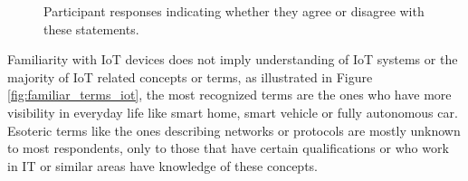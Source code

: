 \begin{figure}[H]
    \begin{center}
        \caption{Participant responses indicating whether they agree or disagree with these statements.}
        \label{fig:internet_of_things_device_usage}
    \end{center}
\end{figure}



Familiarity with IoT devices does not imply understanding of IoT systems
or the majority of IoT related concepts or terms,
as illustrated in Figure \ref{fig:familiar_terms_iot},
the most recognized terms are the ones who have more visibility
in everyday life like smart home, smart vehicle or fully autonomous car.
Esoteric terms like the ones describing networks or protocols are mostly
unknown to most respondents, only to those that have certain
qualifications or who work in IT or similar areas have knowledge of these concepts.

